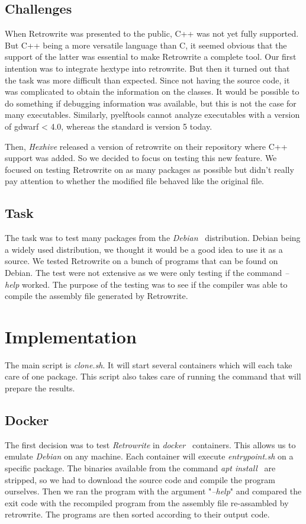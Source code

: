 \documentclass[a4paper,11pt,oneside]{report}
\newcommand{\sysname}{Retrowrite\xspace}
\begin{document}
\section{Challenges}
When Retrowrite was presented to the public, C++ was not yet fully supported.
But C++ being a more versatile language than C, it seemed obvious that the
support of the latter was essential to make Retrowrite a complete tool. Our
first intention was to integrate hextype into retrowrite. But then it turned
out that the task was more difficult than expected. Since not having the source
code, it was complicated to obtain the information on the classes. It would be
possible to do something if debugging information was available, but this is
not the case for many executables. Similarly, pyelftools cannot analyze
executables with a version of gdwarf < 4.0, whereas the standard is version 5
today.

Then, \textit{Hexhive} released a version of retrowrite on their repository
where C++ support was added. So we decided to focus on testing this new
feature.
We focused on testing \sysname on as many packages as possible but didn't
really pay attention to whether the modified file behaved like the original
file.

\section{Task}
The task was to test many packages from the
\textit{Debian}~\cite{debian} distribution. Debian being a widely used
distribution, we thought it would be a good idea to use it as a source. 
We tested Retrowrite on a bunch of programs that can be found on Debian.
The test were not extensive as we were only testing if the command
\textit{--help} worked. The purpose of the testing was to see if the compiler
was able to compile the assembly file generated by \sysname.


\chapter{Implementation}

The main script is \textit{clone.sh}. It will start several containers which will
each take care of one package. This script also takes care of running the
command that will prepare the results.

\section{Docker}
The first decision was to test \textit{Retrowrite} in
\textit{docker}~\cite{merkel2014docker} containers. This allows us to emulate
\textit{Debian} on any machine. Each container will execute
\textit{entrypoint.sh} on a specific package. The binaries available from the
command \textit{apt install}~\cite{apt} are stripped, so we had to download the
source code and compile the program ourselves. Then we ran the program with the
argument "\textit{--help}" and compared the exit code with the recompiled
program from the assembly file re-assambled by retrowrite. The programs are
then sorted according to their output code.
\end{document}
